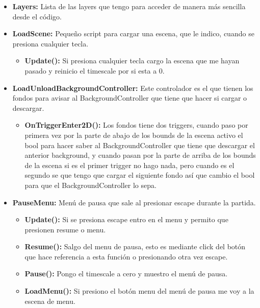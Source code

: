 \documentclass[titlepage, 4apaper]{article}
\begin{document}
\begin{itemize}
  \item \textbf{Layers:} Lista de las layers que tengo para acceder de manera más sencilla desde el código.

  \item \textbf{LoadScene:} Pequeño script para cargar una escena, que le indico, cuando se presiona cualquier tecla.
	\begin{itemize}
    \item \textbf{Update():} Si presiona cualquier tecla cargo la escena que me hayan pasado y reinicio el timescale por si esta a 0.
  \end{itemize}

  \item \textbf{LoadUnloadBackgroundController:} Este controlador es el que tienen los fondos para avisar al BackgroundController que tiene que hacer si cargar o descargar.
	\begin{itemize}
    \item \textbf{OnTriggerEnter2D():} Los fondos tiene dos triggers, cuando paso por primera vez por la parte de abajo de los bounds de la escena activo el bool para hacer saber al BackgroundController que tiene que descargar el anterior background, y cuando pasan por la parte de arriba de los bounds de la escena si es el primer trigger no hago nada, pero cuando es el segundo se que tengo que cargar el siguiente fondo así que cambio el bool para que el BackgroundController lo sepa.
  \end{itemize}

  \item \textbf{PauseMenu:} Menú de pausa que sale al presionar escape durante la partida.
	\begin{itemize}
    \item \textbf{Update():} Si se presiona escape entro en el menu y permito que presionen resume o menu.
    \item \textbf{Resume():} Salgo del menu de pausa, esto es mediante click del botón que hace referencia a esta función o presionando otra vez escape.
		\item \textbf{Pause():} Pongo el timescale a cero y muestro el menú de pausa.
    \item \textbf{LoadMenu():} Si presiono el botón menu del menú de pausa me voy a la escena de menu.
  \end{itemize}


\end{itemize}
\end{document}

